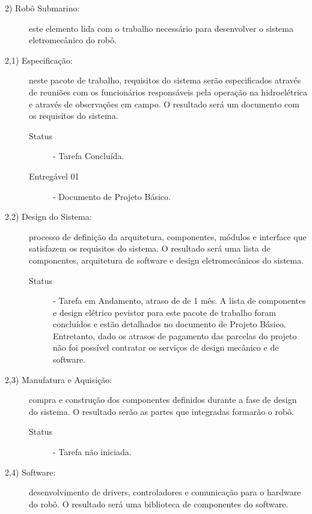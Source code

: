 \begin{description}

\vspace{0,5cm}

\item[ 2)  Robô Submarino:] este elemento lida com o trabalho necessário para desenvolver o sistema eletromecânico do robô. 

\item[2,1) Especificação:] neste pacote de trabalho, requisitos do sistema serão especificados através de reuniões com os funcionários responsáveis pela operação na hidroelétrica e através de observações em campo. O resultado será um documento com os requisitos do sistema.

\begin{description}
	\item [Status] - Tarefa Concluída. 
	\item [Entregável 01] - Documento de Projeto Básico. 
\end{description} 

\item[2,2) Design do Sistema:] processo de definição da arquitetura, componentes, módulos e interface que satisfazem os requisitos do sistema. O resultado será uma lista de componentes, arquitetura de software e design eletromecânicos do sistema.

\begin{description}
	\item [Status] - Tarefa em Andamento, atraso de de 1 mês. A lista de componentes e design elétrico pevistor para este pacote de trabalho foram concluídos e estão detalhados no documento de Projeto Básico. Entretanto, dado os atrasos de pagamento das parcelas do projeto não foi possível contratar os serviços de design mecânico e de software. 
\end{description} 

\item[2,3) Manufatura e Aquisição:] compra e construção dos componentes definidos durante a fase de design do sistema. O resultado serão as partes que integradas formarão o robô. 

\begin{description}
	\item [Status] - Tarefa não iniciada. 
\end{description} 

\item[2,4) Software:] desenvolvimento de drivers, controladores e comunicação para o hardware do robô. O resultado será uma biblioteca de componentes  do software.


\end{description}
